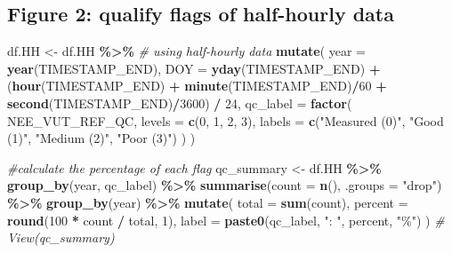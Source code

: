 \documentclass[
]{article}
\newenvironment{Shaded}{\begin{snugshade}}{\end{snugshade}}
\newcommand{\AttributeTok}[1]{\textcolor[rgb]{0.13,0.29,0.53}{#1}}
\newcommand{\CommentTok}[1]{\textcolor[rgb]{0.56,0.35,0.01}{\textit{#1}}}
\newcommand{\DecValTok}[1]{\textcolor[rgb]{0.00,0.00,0.81}{#1}}
\newcommand{\FunctionTok}[1]{\textcolor[rgb]{0.13,0.29,0.53}{\textbf{#1}}}
\newcommand{\NormalTok}[1]{#1}
\newcommand{\OtherTok}[1]{\textcolor[rgb]{0.56,0.35,0.01}{#1}}
\newcommand{\SpecialCharTok}[1]{\textcolor[rgb]{0.81,0.36,0.00}{\textbf{#1}}}
\newcommand{\StringTok}[1]{\textcolor[rgb]{0.31,0.60,0.02}{#1}}
\begin{document}
\subsection{Figure 2: qualify flags of half-hourly
data}\label{figure-2-qualify-flags-of-half-hourly-data}

\begin{Shaded}
\begin{Highlighting}[]
\NormalTok{df.HH }\OtherTok{\textless{}{-}}\NormalTok{ df.HH }\SpecialCharTok{\%\textgreater{}\%} \CommentTok{\# using half{-}hourly data}
  \FunctionTok{mutate}\NormalTok{(}
    \AttributeTok{year =} \FunctionTok{year}\NormalTok{(TIMESTAMP\_END),}
    \AttributeTok{DOY =} \FunctionTok{yday}\NormalTok{(TIMESTAMP\_END) }\SpecialCharTok{+} 
\NormalTok{      (}\FunctionTok{hour}\NormalTok{(TIMESTAMP\_END) }\SpecialCharTok{+} \FunctionTok{minute}\NormalTok{(TIMESTAMP\_END)}\SpecialCharTok{/}\DecValTok{60} \SpecialCharTok{+} \FunctionTok{second}\NormalTok{(TIMESTAMP\_END)}\SpecialCharTok{/}\DecValTok{3600}\NormalTok{) }\SpecialCharTok{/} \DecValTok{24}\NormalTok{,}
    \AttributeTok{qc\_label =} \FunctionTok{factor}\NormalTok{(}
\NormalTok{      NEE\_VUT\_REF\_QC,}
      \AttributeTok{levels =} \FunctionTok{c}\NormalTok{(}\DecValTok{0}\NormalTok{, }\DecValTok{1}\NormalTok{, }\DecValTok{2}\NormalTok{, }\DecValTok{3}\NormalTok{),}
      \AttributeTok{labels =} \FunctionTok{c}\NormalTok{(}\StringTok{"Measured (0)"}\NormalTok{, }\StringTok{"Good (1)"}\NormalTok{, }\StringTok{"Medium (2)"}\NormalTok{, }\StringTok{"Poor (3)"}\NormalTok{)}
\NormalTok{    )}
\NormalTok{  )}

\CommentTok{\#calculate the percentage of each flag}
\NormalTok{qc\_summary }\OtherTok{\textless{}{-}}\NormalTok{ df.HH }\SpecialCharTok{\%\textgreater{}\%}
  \FunctionTok{group\_by}\NormalTok{(year, qc\_label) }\SpecialCharTok{\%\textgreater{}\%}
  \FunctionTok{summarise}\NormalTok{(}\AttributeTok{count =} \FunctionTok{n}\NormalTok{(), }\AttributeTok{.groups =} \StringTok{"drop"}\NormalTok{) }\SpecialCharTok{\%\textgreater{}\%}
  \FunctionTok{group\_by}\NormalTok{(year) }\SpecialCharTok{\%\textgreater{}\%}
  \FunctionTok{mutate}\NormalTok{(}
    \AttributeTok{total =} \FunctionTok{sum}\NormalTok{(count),}
    \AttributeTok{percent =} \FunctionTok{round}\NormalTok{(}\DecValTok{100} \SpecialCharTok{*}\NormalTok{ count }\SpecialCharTok{/}\NormalTok{ total, }\DecValTok{1}\NormalTok{),}
    \AttributeTok{label =} \FunctionTok{paste0}\NormalTok{(qc\_label, }\StringTok{": "}\NormalTok{, percent, }\StringTok{"\%"}\NormalTok{)}
\NormalTok{  )}
\CommentTok{\# View(qc\_summary)}


\end{Highlighting}
\end{Shaded}
\end{document}
